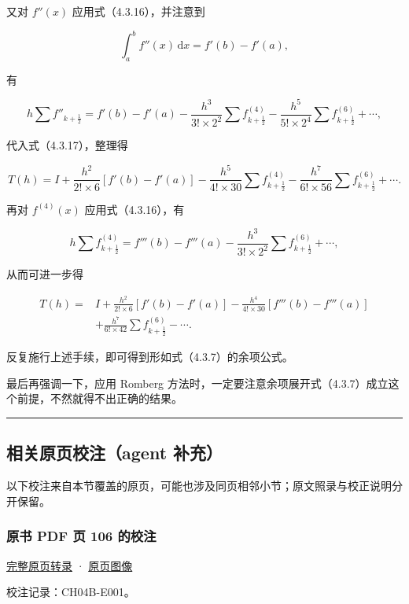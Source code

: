 \documentclass[
  10pt,
  fontset=fandol]{ctexart}
\begin{document}
又对 \(f''(x)\) 应用式（4.3.16），并注意到

\[
\int_a^b f''(x)\,\mathrm{d}x=f'(b)-f'(a),
\]

有

\[
h\sum f''_{k+\frac12}=f'(b)-f'(a)
-\frac{h^3}{3!\times2^2}\sum f^{(4)}_{k+\frac12}
-\frac{h^5}{5!\times2^4}\sum f^{(6)}_{k+\frac12}+\cdots,
\]

代入式（4.3.17），整理得

\[
T(h)=I+\frac{h^2}{2!\times6}[f'(b)-f'(a)]
-\frac{h^5}{4!\times30}\sum f^{(4)}_{k+\frac12}
-\frac{h^7}{6!\times56}\sum f^{(6)}_{k+\frac12}+\cdots.
\]

再对 \(f^{(4)}(x)\) 应用式（4.3.16），有

\[
h\sum f^{(4)}_{k+\frac12}=f'''(b)-f'''(a)
-\frac{h^3}{3!\times2^2}\sum f^{(6)}_{k+\frac12}+\cdots,
\]

从而可进一步得

\[
\begin{aligned}
T(h)={}&I+\frac{h^2}{2!\times6}[f'(b)-f'(a)]
-\frac{h^4}{4!\times30}[f'''(b)-f'''(a)]\\
&+\frac{h^7}{6!\times42}\sum f^{(6)}_{k+\frac12}-\cdots.
\end{aligned}
\tag{4.3.18}
\]

反复施行上述手续，即可得到形如式（4.3.7）的余项公式。

最后再强调一下，应用 Romberg 方法时，一定要注意余项展开式（4.3.7）成立这个前提，不然就得不出正确的结果。

\begin{center}\rule{0.5\linewidth}{0.5pt}\end{center}

\subsection{相关原页校注（agent 补充）}\label{ux76f8ux5173ux539fux9875ux6821ux6ce8agent-ux8865ux5145}

以下校注来自本节覆盖的原页，可能也涉及同页相邻小节；原文照录与校正说明分开保留。

\subsubsection{原书 PDF 页 106 的校注}\label{ux539fux4e66-pdf-ux9875-106-ux7684ux6821ux6ce8}

\href{../pages/pdf-106.md}{完整原页转录} · \href{../../source-images/pdf-106.jpeg}{原页图像}

校注记录：CH04B-E001。
\end{document}
